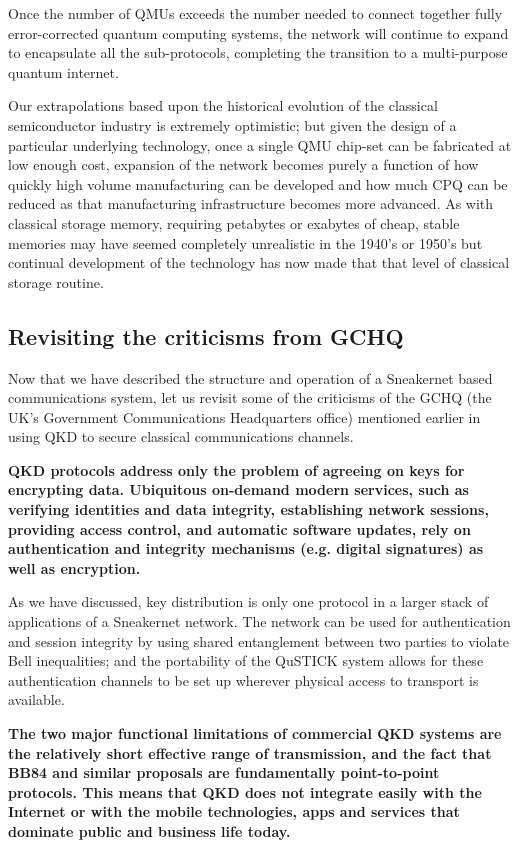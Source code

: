 \documentclass[twocolumn, aps, rmp, amsmath, amssymb, nofootinbib, superscriptaddress, longbibliography, floatfix, table-of-contents, eqsecnum]{revtex4-2}
\begin{document}
Once the number of QMUs exceeds the number needed to connect together fully error-corrected quantum computing systems, the network will continue to expand to encapsulate all the sub-protocols, completing the transition to a multi-purpose quantum internet. 

Our extrapolations based upon the historical evolution of the classical semiconductor industry is extremely optimistic; but given the design of a particular underlying technology, once a single QMU chip-set can be fabricated at low enough cost, expansion of the network becomes purely a function of how quickly high volume manufacturing can be developed and how much CPQ can be reduced as that manufacturing infrastructure becomes more advanced. As with classical storage memory, requiring petabytes or exabytes of cheap, stable memories may have seemed completely unrealistic in the 1940's or 1950's but continual development of the technology has now made that that level of classical storage routine.

\subsection{Revisiting the criticisms from GCHQ}

Now that we have described the structure and operation of a Sneakernet based communications system, let us revisit some of the criticisms of the GCHQ (the UK's Government Communications Headquarters office) mentioned earlier in using QKD to secure classical communications channels. 

\textbf{QKD protocols address only the problem of agreeing on keys for encrypting data. Ubiquitous on-demand modern services, such as verifying identities and data integrity, establishing network sessions, providing access control, and automatic software updates, rely on authentication and integrity mechanisms (e.g. digital signatures) as well as encryption.}

As we have discussed, key distribution is only one protocol in a larger stack of applications of a Sneakernet network. The network can be used for authentication and session integrity by using shared entanglement between two parties to violate Bell inequalities; and the portability of the QuSTICK system allows for these authentication channels to be set up wherever physical access to transport is available.

\textbf{The two major functional limitations of commercial QKD systems are the relatively short effective range of transmission, and the fact that BB84 and similar proposals are fundamentally point-to-point protocols. This means that QKD does not integrate easily with the Internet or with the mobile technologies, apps and services that dominate public and business life today.}
\end{document}
